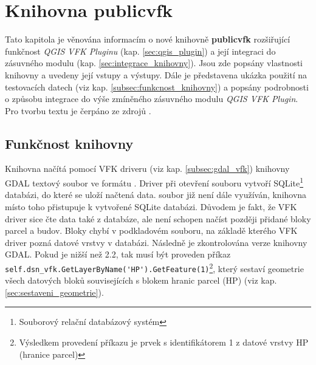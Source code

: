 \chapter{Knihovna publicvfk}
\label{4-plugin}
Tato kapitola je věnována informacím o nové knihovně
\textbf{publicvfk} rozšiřující funkčnost \textit{QGIS VFK Pluginu}
(kap. \ref{sec:qgis_plugin}) a její
integraci do zásuvného modulu (kap. \ref{sec:integrace_knihovny}). Jsou
zde popsány vlastnosti knihovny a uvedeny
její vstupy a výstupy. Dále je představena ukázka použití na
testovacích datech (viz kap. \ref{subsec:funkcnost_knihovny}) a
popsány podrobnosti o způsobu integrace do výše zmíněného zásuvného
modulu \textit{QGIS VFK
  Plugin}. Pro tvorbu textu je čerpáno ze zdrojů \cite{cookbook,
  ucebnicepython}.

\section{Funkčnost knihovny}
\label{sec:funknost_knihovny}
Knihovna načítá pomocí VFK driveru (viz kap. \ref{subsec:gdal_vfk})
knihovny GDAL 
textový soubor ve formátu . Driver při otevření
souboru vytvoří SQLite\footnote{Souborový relační databázový systém} databázi,
do které se uloží načtená data.  soubor již není
dále využíván, knihovna místo toho přistupuje k vytvořené SQLite
databázi. Důvodem je fakt, že VFK driver sice čte data také z
databáze, ale není schopen načíst později přidané bloky parcel a
budov. Bloky chybí v podkladovém  souboru, na základě kterého
VFK driver pozná datové vrstvy v databázi. Následně je zkontrolována
verze knihovny GDAL. Pokud je nižší než 2.2, tak musí být proveden
příkaz \newline \verb|self.dsn_vfk.GetLayerByName('HP').GetFeature(1)|\footnote{Výsledkem provedení příkazu je prvek s identifikátorem 1 z datové vrstvy HP (hranice parcel)}, který sestaví geometrie všech datových bloků souvisejících s
blokem hranic parcel (HP) (viz kap. \ref{sec:sestaveni_geometrie}).

